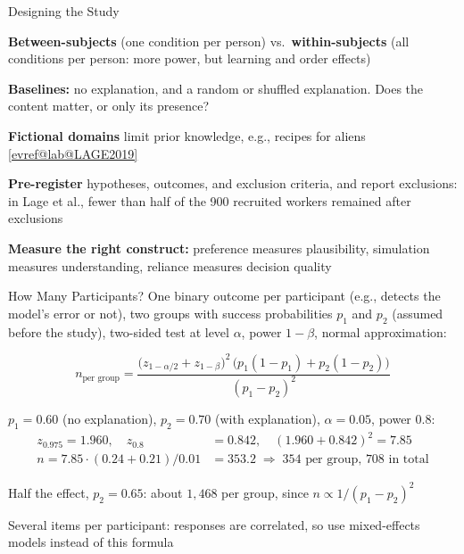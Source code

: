 \documentclass[10pt,compress,t,notes=noshow, xcolor=table, handout]{beamer}
\makeatletter
\newcommand{\citeref}[1]{%
  \href{\csname evref@url@#1\endcsname}{[\csname evref@lab@#1\endcsname]}}
\makeatother
\begin{document}
\begin{framev}[align=mid]{Designing the Study}
\begin{itemizeM}
\item \textbf{Between-subjects} (one condition per person) vs.\ \textbf{within-subjects} (all conditions per person: more power, but learning and order effects)
\item \textbf{Baselines:} no explanation, and a random or shuffled explanation. Does the content matter, or only its presence?
\item \textbf{Fictional domains} limit prior knowledge, e.g., recipes for aliens \citeref{LAGE2019}
\item \textbf{Pre-register} hypotheses, outcomes, and exclusion criteria, and report exclusions: in Lage et al., fewer than half of the 900 recruited workers remained after exclusions
\item \textbf{Measure the right construct:} preference measures plausibility, simulation measures understanding, reliance measures decision quality
\end{itemizeM}
\end{framev}


\begin{framev}[align=mid]{How Many Participants?}
One binary outcome per participant (e.g., detects the model's error or not), two groups with success probabilities $p_1$ and $p_2$ (assumed before the study), two-sided test at level $\alpha$, power $1-\beta$, normal approximation:
\begin{definition}
\[n_{\text{per group}} = \frac{\big(z_{1-\alpha/2} + z_{1-\beta}\big)^2\,\big(p_1(1-p_1) + p_2(1-p_2)\big)}{(p_1 - p_2)^2}\]
\end{definition}
\begin{example}
$p_1 = 0.60$ (no explanation), $p_2 = 0.70$ (with explanation), $\alpha = 0.05$, power $0.8$:
\begin{align*}
z_{0.975} = 1.960, \quad z_{0.8} &= 0.842, \quad (1.960 + 0.842)^2 = 7.85\\
n = 7.85 \cdot (0.24 + 0.21)/0.01 &= 353.2 \;\Rightarrow\; 354 \text{ per group, } 708 \text{ in total}
\end{align*}
\end{example}
\pause
\begin{itemizeS}
\item Half the effect, $p_2 = 0.65$: about $1{,}468$ per group, since $n \propto 1/(p_1 - p_2)^2$
\item Several items per participant: responses are correlated, so use mixed-effects models instead of this formula
\end{itemizeS}
\end{framev}
\end{document}
